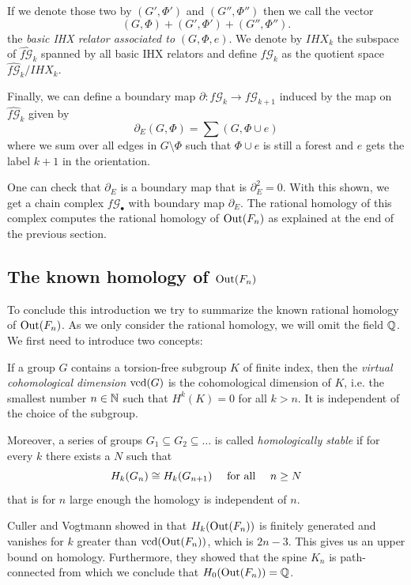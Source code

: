 If we denote those two by $(G',\Phi')$ and  $(G'',\Phi'')$ then we call the vector
\[
	(G,\Phi) + (G',\Phi') + (G'',\Phi'')
.\] 
the \emph{basic IHX relator associated to} $(G,\Phi,e)$. 
We denote by $IHX_{k}$ the subspace of $\widehat{f\mathcal{G}}_{k}$ spanned by all basic IHX relators
and define $f\mathcal{G}_{k}$ as the quotient space $\widehat{f\mathcal{G}}_{k} / IHX_{k}$.

Finally, we can define a boundary map  $\partial: f\mathcal{G}_{k} \to f\mathcal{G}_{k+1}$ induced by the map on $\widehat{f \mathcal{G}}_{k}$ given by
\[
	\partial_{E}(G,\Phi) = \sum (G,\Phi \cup e)
\] 
where we sum over all edges in $G \setminus \Phi$ such that $\Phi \cup e$ is still a forest and 
$e$ gets the label $k+1$ in the orientation.

One can check that $\partial_{E}$ is a boundary map that is $\partial_{E}^2 = 0$.
With this shown, we get a chain complex $f\mathcal{G}_{\bullet}$ with boundary map $\partial_{E}$.
The rational homology of this complex computes the rational homology of $\operatorname{Out}(F_{n})$ as
explained at the end of the previous section.

\subsection{The known homology of \texorpdfstring{\boldmath$\operatorname{Out}(F_{n})$}{Out(Fn)}}
To conclude this introduction we try to summarize the known rational homology of $\operatorname{Out}(F_{n})$.
As we only consider the rational homology, we will omit the field $\mathbb{Q}$.
We first need to introduce two concepts:
\begin{definition}
	If a group $G$ contains a torsion-free subgroup $K$ of finite index, then the \emph{virtual cohomological dimension} $\operatorname{vcd}(G)$
	is the cohomological dimension of $K$, i.e. the smallest number $n \in \mathbb{N}$ such that $H^{k}(K) = 0$ for all $k > n$. It is independent of the choice of the subgroup.

Moreover, a series of groups $G_1 \subseteq G_2 \subseteq \ldots$ is called \emph{homologically stable} if for every $k$ 
there exists a $N$ such that 
\[
	H_{k}(G_{n}) \cong H_{k}(G_{n+1}) \qq{ for all } n \geq N
\]
that is for $n$ large enough the homology is independent of  $n$.
\end{definition}

Culler and Vogtmann showed in \cite{vogtmann86} that $H_{k}(\operatorname{Out}(F_{n}))$ is finitely generated and vanishes for $k$ greater
than $\operatorname{vcd}(\operatorname{Out}(F_{n}))$, which is $2n -3$. This gives us an upper bound on homology.
Furthermore, they showed that the spine $K_{n}$ is path-connected from which we conclude that $H_0(\operatorname{Out}(F_{n})) = \mathbb{Q}$.

